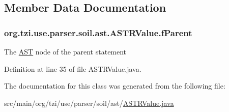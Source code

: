 \subsection{Member Data Documentation}
\hypertarget{classorg_1_1tzi_1_1use_1_1parser_1_1soil_1_1ast_1_1_a_s_t_r_value_a283218219adf75e8270e3981817fd82c}{
\subsubsection[{f\-Parent}]{ org.\-tzi.\-use.\-parser.\-soil.\-ast.\-A\-S\-T\-R\-Value.\-f\-Parent\hspace{0.3cm}{\ttfamily [protected]}}}\label{classorg_1_1tzi_1_1use_1_1parser_1_1soil_1_1ast_1_1_a_s_t_r_value_a283218219adf75e8270e3981817fd82c}
The \hyperlink{classorg_1_1tzi_1_1use_1_1parser_1_1_a_s_t}{A\-S\-T} node of the parent statement 

Definition at line 35 of file A\-S\-T\-R\-Value.\-java.



The documentation for this class was generated from the following file\-:\begin{DoxyCompactItemize}
\item 
src/main/org/tzi/use/parser/soil/ast/\hyperlink{_a_s_t_r_value_8java}{A\-S\-T\-R\-Value.\-java}\end{DoxyCompactItemize}
